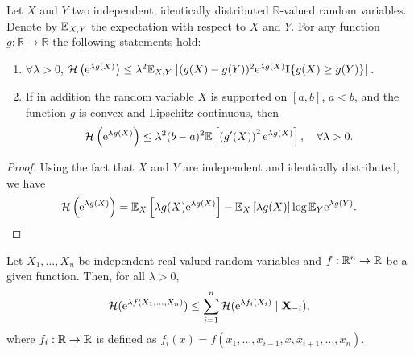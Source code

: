 \begin{definition}
\end{definition}
\begin{lemma}\label{lem:entropy-bound-univariate}
	Let \(X\) and \(Y\) two independent, identically distributed \(\mathbb{R}\)-valued random variables. Denote by \(\mathbb{E}_{X, Y}\) the expectation with respect to \(X\) and \(Y\). For any function \(g: \mathbb{R} \rightarrow \mathbb{R}\) the following statements hold:
	\begin{enumerate}
		\item \(\forall\lambda>0\), \(\mathcal{H}\left(\mathrm{e}^{\lambda g(X)}\right) \leq \lambda^2 \mathbb{E}_{X, Y}\left[(g(X)-g(Y))^2\mathrm{e}^{\lambda g(X)}\mathbf{I}\{g(X) \geq g(Y)\}\right]\).
		\item If in addition the random variable \(X\) is supported on \([a, b]\), \(a<b\), and the function \(g\) is convex and Lipschitz continuous, then
		      \begin{equation*}
			      \mathcal{H}\left(\mathrm{e}^{\lambda g(X)}\right) \leq \lambda^2(b-a)^2 \mathbb{E}\left[\left(g^{\prime}(X)\right)^2 \mathrm{e}^{\lambda g(X)}\right],\quad\forall\lambda>0.
		      \end{equation*}
	\end{enumerate}
\end{lemma}

\begin{proof}
	Using the fact that \(X\) and \(Y\) are independent and identically distributed, we have
	\begin{equation*}
		\mathcal{H}\left(\mathrm{e}^{\lambda g(X)}\right)=\mathbb{E}_{X}\left[\lambda g(X)\mathrm{e}^{\lambda g(X)}\right]-\mathbb{E}_{X}\left[\lambda g(X)\right]\log\mathbb{E}_{Y}\mathrm{e}^{\lambda g(Y)}.
	\end{equation*}
\end{proof}

\begin{lemma}\label{lem:tensorisation-entropy}
	Let \(X_{1}, \ldots, X_{n}\) be independent real-valued random variables and \(f:\mathbb{R}^{n}\to\mathbb{R}\) be a given function. Then, for all \(\lambda>0\),
	\begin{equation*}
		\mathcal{H}(\mathrm{e}^{\lambda f(X_{1}, \ldots, X_{n})})\leq\sum_{i=1}^{n}\mathcal{H}(\mathrm{e}^{\lambda f_{i}(X_{i})}\mid \mathbf{X}_{-i}),
	\end{equation*}
	where \(f_{i}:\mathbb{R}\to\mathbb{R}\) is defined as \(f_{i}(x)=f(x_{1}, \ldots, x_{i-1}, x, x_{i+1}, \ldots, x_{n})\).
\end{lemma}

